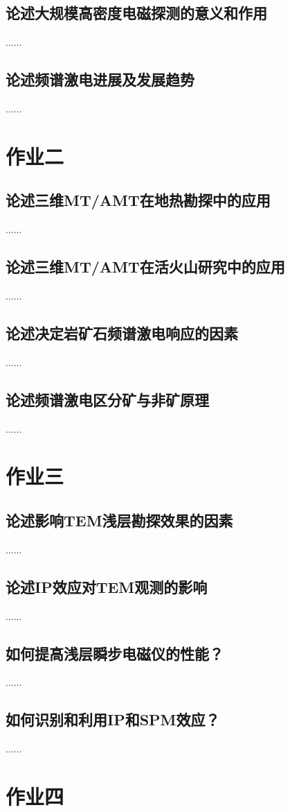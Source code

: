 \documentclass{coursework}
\begin{document}
	\subsection{论述大规模高密度电磁探测的意义和作用}
	......
	\subsection{论述频谱激电进展及发展趋势}
	......
	
	\section{作业二}
	\subsection{论述三维MT/AMT在地热勘探中的应用}
	......	
	\subsection{论述三维MT/AMT在活火山研究中的应用}
	......	
	\subsection{论述决定岩矿石频谱激电响应的因素}
	......	
	\subsection{论述频谱激电区分矿与非矿原理}
	......	

	\section{作业三}
	\subsection{论述影响TEM浅层勘探效果的因素}
	......
	\subsection{论述IP效应对TEM观测的影响}
	......	
	\subsection{如何提高浅层瞬步电磁仪的性能？}
	......
	\subsection{如何识别和利用IP和SPM效应？}
	......
	\section{作业四}
\end{document}
